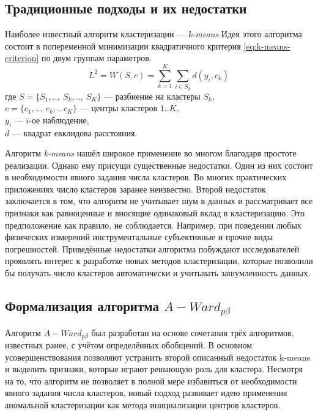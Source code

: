 \documentclass[12pt,twoside,a4paper,tikz,border=5]{refart}
\begin{document}
		\subsection{Традиционные подходы и их недостатки}
			Наиболее известный алгоритм кластеризации --- \textit{k-means} \cite{k-means} Идея этого алгоритма состоит в попеременной минимизации квадратичного критерия \eqref{eq:k-means-criterion} по двум группам параметров.
			\begin{equation} \label{eq:k-means-criterion}
				L^2= W(S,c) = \sum_{k=1}^{K}\sum_{i\in S_k}d(y_i,c_k)
			\end{equation}
			\noindent где $S = \{S_1, ..,\: S_k, ..,\: S_K\}$ --- разбиение на кластеры $ S_k $,\\
			\phantom{где\space}$c = \{c_1, ..,\:c_k,..\: c_K\}$ --- центры кластеров $ 1..K $,\\
			\phantom{где\space}$y_i$ --- $i$-ое наблюдение,\\
			\phantom{где\space}$d$ --- квадрат евклидова расстояния.
			
			Алгоритм \textit{k-means} нашёл широкое применение во многом благодаря простоте реализации. Однако ему присущи существенные недостатки. Один из них состоит в необходимости явного задания числа кластеров. Во многих практических приложениях число кластеров заранее неизвестно. Второй недостаток заключается в том, что алгоритм не учитывает шум в данных и рассматривает все признаки как равноценные и вносящие одинаковый вклад в кластеризацию. Это предположение как правило, не соблюдается. Например, при поведении любых физических измерений инструментальные субъективные и прочие виды погрешностей. Приведённые недостатки алгоритма побуждают исследователей проявлять интерес к разработке новых методов кластеризации, которые позволили бы получать число кластеров автоматически и учитывать зашумленность данных.
		\subsection{Формализация алгоритма $ A-Ward_{p\beta} $}
			Алгоритм $ A-Ward_{p\beta} $ был разработан на основе сочетания трёх алгоритмов, известных ранее, с учётом определённых обобщений. В основном усовершенствования позволяют устранить второй описанный недостаток k-means и выделить признаки, которые играют решающую роль для кластера. Несмотря на то, что алгоритм не позволяет в полной мере избавиться от необходимости явного задания числа кластеров, новый подход развивает идею применения аномальной кластеризации как метода инициализации центров кластеров.
			
\end{document}

